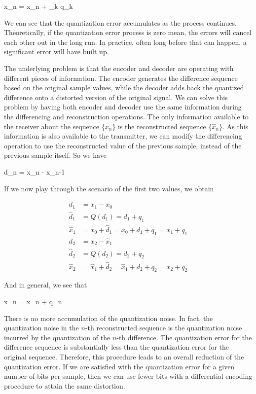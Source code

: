 \bee
\hat x_n = x_n + \sum_k q_k
\eee

We can see that the quantization error accumulates as the process continues. Theoretically, if the quantization error process is zero mean, the errors will cancel each other out in the long run. In practice, often long before that can happen, a significant error will have built up.


The underlying problem is that the encoder and decoder are operating with different pieces of information. The encoder generates the difference sequence based on the original sample values, while the decoder adds back the quantized difference onto a distorted version of the original signal. We can solve this problem by having both encoder and decoder use the same information during the differencing and reconstruction operations. The only information available to the receiver about the sequence $\{ x_n\}$ is the reconstructed sequence $\{ \hat x_n\}$. As this information is also available to the transmitter, we can modify the differencing operation to use the reconstructed value of the previous sample, instead of the previous sample itself. So we have

\bee
d_n = x_n - \hat x_{n-1}
\eee

If we now play through the scenario of the first two values, we obtain

\begin{align*}
  d_1 &= x_1 - x_0 \\
  \hat d_1 &= Q(d_1) = d_1 + q_1 \\
  \hat x_1 &= x_0 + \hat d_1 = x_0 + d_1 + q_1 = x_1 + q_1 \\
  d_2 &= x_2 - \hat x_1 \\
  \hat d_2 &= Q(d_2) = d_2 + q_2 \\
  \hat x_2 &= \hat x_1 + \hat d_2 = \hat x_1 + d_2 + q_2 = x_2 + q_2
\end{align*}

And in general, we see that

\bee
\hat x_n = x_n + q_n
\eee

There is no more accumulation of the quantization noise. In fact, the quantization noise in the $n$-th reconstructed sequence is the quantization noise incurred by the quantization of the $n$-th difference. The quantization error for the difference sequence is substantially less than the quantization error for the original sequence. Therefore, this procedure leads to an overall reduction of the quantization error. If we are satisfied with the quantization error for a given number of bits per sample, then we can use fewer bits with a differential encoding procedure to attain the same distortion.

